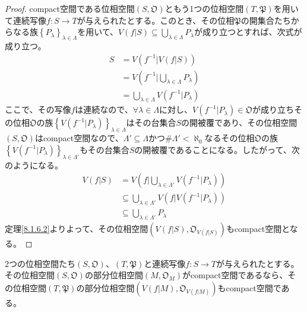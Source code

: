 \documentclass[dvipdfmx]{jsarticle}
\begin{document}
\begin{proof}
compact空間である位相空間$\left( S,\mathfrak{O} \right)$ともう1つの位相空間$\left( T,\mathfrak{P} \right)$を用いて連続写像$f:S \rightarrow T$が与えられたとする。このとき、その位相$\mathfrak{P}$の開集合たちからなる族$\left\{ P_{\lambda} \right\}_{\lambda \in \varLambda}$を用いて、$V\left( f|S \right) \subseteq \bigcup_{\lambda \in \varLambda} P_{\lambda}$が成り立つとすれば、次式が成り立つ。
\begin{align*}
S &= V\left( f^{- 1}|V\left( f|S \right) \right)\\
&= V\left( f^{- 1}|\bigcup_{\lambda \in \varLambda} P_{\lambda} \right)\\
&= \bigcup_{\lambda \in \varLambda} {V\left( f^{- 1}|P_{\lambda} \right)}
\end{align*}
ここで、その写像$f$は連続なので、$\forall\lambda \in \varLambda$に対し、$V\left( f^{- 1}|P_{\lambda} \right)\in \mathfrak{O}$が成り立ちその位相$\mathfrak{O}$の族$\left\{ V\left( f^{- 1}|P_{\lambda} \right) \right\}_{\lambda \in \varLambda}$はその台集合$S$の開被覆であり、その位相空間$\left( S,\mathfrak{O} \right)$はcompact空間なので、$\varLambda' \subseteq \varLambda$かつ${\#}\varLambda' < \aleph_{0}$なるその位相$\mathfrak{O}$の族$\left\{ V\left( f^{- 1}|P_{\lambda} \right) \right\}_{\lambda \in \varLambda'}$もその台集合$S$の開被覆であることになる。したがって、次のようになる。
\begin{align*}
V\left( f|S \right) &= V\left( f|\bigcup_{\lambda \in \varLambda'} {V\left( f^{- 1}|P_{\lambda} \right)} \right)\\
&\subseteq \bigcup_{\lambda \in \varLambda'} {V\left( f|V\left( f^{- 1}|P_{\lambda} \right) \right)}\\
&\subseteq \bigcup_{\lambda \in \varLambda'} P_{\lambda}
\end{align*}
定理\ref{8.1.6.2}よりよって、その位相空間$\left( V\left( f|S \right),\mathfrak{O}_{V\left( f|S \right)} \right)$もcompact空間となる。
\end{proof}
\begin{thm}\label{8.1.6.6}
2つの位相空間たち$\left( S,\mathfrak{O} \right)$、$\left( T,\mathfrak{P} \right)$と連続写像$f:S \rightarrow T$が与えられたとする。その位相空間$\left( S,\mathfrak{O} \right)$の部分位相空間$\left( M,\mathfrak{O}_{M} \right)$がcompact空間であるなら、その位相空間$\left( T,\mathfrak{P} \right)$の部分位相空間$\left( V\left( f|M \right),\mathfrak{O}_{V\left( f|M \right)} \right)$もcompact空間である。
\end{thm}
\end{document}
